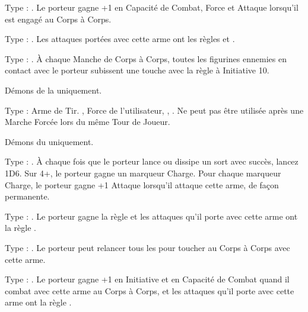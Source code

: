 \begin{multicols}{2}\raggedcolumns

\subtitle{Armes Démoniaques}\vspace{5pt}

\startpricelist

Type : \hw{}. Le porteur gagne +1 en Capacité de Combat, Force et Attaque lorsqu'il est engagé au Corps à Corps.

Type : \hw{}. Les attaques portées avec cette arme ont les règles  et .

Type : \hw{}. À chaque Manche de Corps à Corps, toutes les figurines ennemies en contact avec le porteur subissent une touche avec la règle \toxicattacks{} à Initiative 10.

Démons de la \textbf{\dlust} uniquement.

Type : Arme de Tir. , Force de l'utilisateur, , \quicktofire{}. Ne peut pas être utilisée après une Marche Forcée lors du même Tour de Joueur.

Démons du \textbf{\dchange} uniquement.

Type : \hw{}. À chaque fois que le porteur lance ou dissipe un sort avec succès, lancez 1D6. Sur 4+, le porteur gagne un marqueur Charge. Pour chaque marqueur Charge, le porteur gagne +1 Attaque lorsqu'il attaque cette arme, de façon permanente.

Type : \hw{}. Le porteur gagne la règle \fear{} et les attaques qu'il porte avec cette arme ont la règle \divineattacks{}.

Type : \hw{}. Le porteur peut relancer tous les  pour toucher au Corps à Corps avec cette arme.

Type : \hw{}. Le porteur gagne +1 en Initiative et en Capacité de Combat quand il combat avec cette arme au Corps à Corps, et les attaques qu'il porte avec cette arme ont la règle .

\endpricelist

\columnbreak

\subtitle{Talismans démoniaques}\vspace{5pt}

\startpricelist


\end{multicols}
